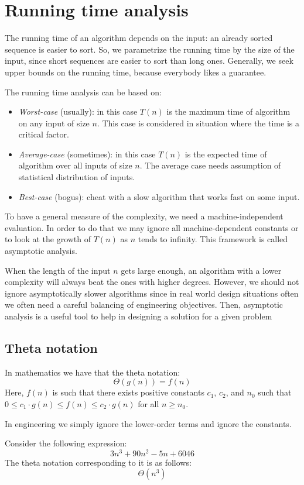 \section{Running time analysis}

The running time of an algorithm depends on the input: an already sorted sequence is easier to sort. 
So, we parametrize the running time by the size of the input, since short sequences are easier to sort than long ones.
Generally, we seek upper bounds on the running time, because everybody likes a guarantee.

The running time analysis can be based on: 
\begin{itemize}
    \item \textit{Worst-case} (usually): in this case $T(n)$ is the maximum time of algorithm on any input of size $n$. 
        This case is considered in situation where the time is a critical factor. 
    \item \textit{Average-case} (sometimes):  in this case $T(n)$ is the expected time of algorithm over all inputs of size $n$. 
        The average case needs assumption of statistical distribution of inputs.
    \item \textit{Best-case} (bogus): cheat with a slow algorithm that works fast on some input.
\end{itemize}
To have a general measure of the complexity, we need a machine-independent evaluation. 
In order to do that we may ignore all machine-dependent constants or to look at the growth of $T(n)$ as $n$ tends to infinity.
This framework is called asymptotic analysis. 

When the length of the input $n$ gets large enough, an algorithm with a lower complexity will always beat the ones with higher degrees.
However, we should not ignore asymptotically slower algorithms since in real world design situations often we often need a careful balancing of engineering objectives. 
Then, asymptotic analysis is a useful tool to help in designing a solution for a given problem 

\subsection{Theta notation}
In mathematics we have that the theta notation: 
\[\Theta\left(g(n)\right)=f(n)\]
Here, $f(n)$ is such that there exists positive constants $c_1$, $c_2$, and $n_0$ such that $0 \leq c_1 \cdot g(n) \leq f (n) \leq c_2 \cdot g(n)$ for all $n \geq n_0$. 

In engineering we simply ignore the lower-order terms and ignore the constants. 
\begin{example}
    Consider the following expression: 
    \[3n^3+90n^2-5n+6046\]
    The theta notation corresponding to it is as follows: 
    \[\Theta(n^3)\]
\end{example}

